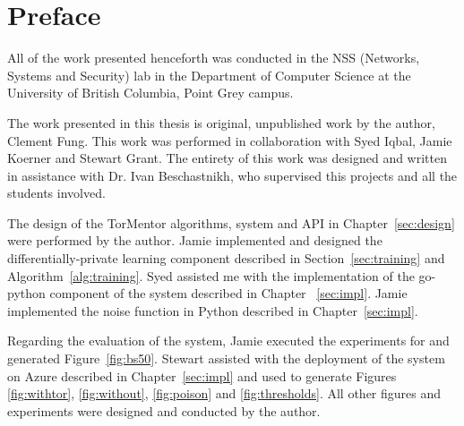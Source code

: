 
\chapter{Preface}

All of the work presented henceforth was conducted in the NSS 
(Networks, Systems and Security) lab in the Department of Computer
Science at the University of British Columbia, Point Grey campus.

The work presented in this thesis is original, unpublished work by 
the author, Clement Fung. This work was performed in
collaboration with Syed Iqbal, Jamie Koerner and Stewart Grant. The
entirety of this work was designed and written in assistance with Dr. Ivan
Beschastnikh, who supervised this projects and all the students
involved.

The design of the TorMentor algorithms, system and API in 
Chapter~\ref{sec:design} were performed by the author. Jamie
implemented and designed the differentially-private learning component
described in Section~\ref{sec:training} and 
Algorithm~\ref{alg:training}. Syed assisted me with the implementation
of the go-python component of the system described in Chapter~
\ref{sec:impl}. Jamie implemented the noise function in Python
described in Chapter~\ref{sec:impl}.

Regarding the evaluation of the system, Jamie executed the experiments
for and generated Figure~\ref{fig:bs50}. Stewart assisted with the
deployment of the system on Azure described in Chapter~\ref{sec:impl}
and used to generate Figures \ref{fig:withtor}, \ref{fig:without},
\ref{fig:poison} and \ref{fig:thresholds}. All other figures and
experiments were designed and conducted by the author.

